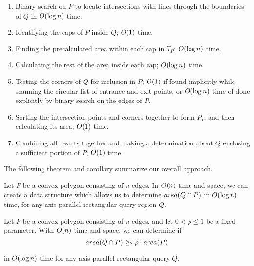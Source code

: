 \begin{enumerate}
 \item Binary search on $P$ to locate intersections with lines through the boundaries of $Q$ in $O\!\left(\log{n}\right)$ time.
 
 \item Identifying the caps of $P$ inside $Q$; $O\!\left(1\right)$ time.

 \item Finding the precalculated area within each cap in $T_P$; $O\!\left(\log{n}\right)$ time.

 \item Calculating the rest of the area inside each cap; $O\!\left(\log{n}\right)$ time.

 \item Testing the corners of $Q$ for inclusion in $P$; $O\!\left(1\right)$ if found implicitly while scanning the circular list of entrance and exit points, or $O\!\left(\log{n}\right)$ time of done explicitly by binary search on the edges of $P$.
 
 \item Sorting the intersection points and corners together to form $P_I$, and then calculating its area; $O\!\left(1\right)$ time.
 
 \item Combining all results together and making a determination about $Q$ enclosing a sufficient portion of $P$; $O\!\left(1\right)$ time.
 
\end{enumerate}

\noindent The following theorem and corollary summarize our overall approach.

\begin{theorem}
\label{th:convexp:area}
Let $P$ be a convex polygon consisting of $n$ edges. In $O\!\left(n\right)$ time and space, we can create a data structure which allows us to determine $area(Q \cap P)$ in $O\!\left(\log{n}\right)$ time, for any axis-parallel rectangular query region $Q$.
\end{theorem}

\begin{corollary}
\label{cor:convexp:mp}
Let $P$ be a convex polygon consisting of $n$ edges, and let $0 < \rho \leq 1$ be a fixed parameter. With $O\!\left(n\right)$ time and space, we can determine if
\[ 
area(Q \cap P) \geq_? \rho \cdot area(P)
\]

\noindent in $O\!\left(\log{n}\right)$ time for any axis-parallel rectangular query $Q$.
\end{corollary}


